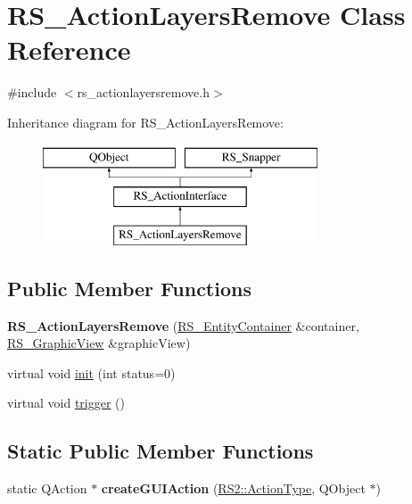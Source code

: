 \hypertarget{classRS__ActionLayersRemove}{\section{R\-S\-\_\-\-Action\-Layers\-Remove Class Reference}
\label{classRS__ActionLayersRemove}
}


{\ttfamily \#include $<$rs\-\_\-actionlayersremove.\-h$>$}

Inheritance diagram for R\-S\-\_\-\-Action\-Layers\-Remove\-:\begin{figure}[H]
\begin{center}
\leavevmode
\includegraphics[height=3.000000cm]{classRS__ActionLayersRemove}
\end{center}
\end{figure}
\subsection*{Public Member Functions}
\begin{DoxyCompactItemize}
\item 
\hypertarget{classRS__ActionLayersRemove_a7b2fbd6d0ccc23fa982b6b09833879ac}{{\bfseries R\-S\-\_\-\-Action\-Layers\-Remove} (\hyperlink{classRS__EntityContainer}{R\-S\-\_\-\-Entity\-Container} \&container, \hyperlink{classRS__GraphicView}{R\-S\-\_\-\-Graphic\-View} \&graphic\-View)}\label{classRS__ActionLayersRemove_a7b2fbd6d0ccc23fa982b6b09833879ac}

\item 
virtual void \hyperlink{classRS__ActionLayersRemove_ad5be6abe979d6e815d20e197c5f75f30}{init} (int status=0)
\item 
virtual void \hyperlink{classRS__ActionLayersRemove_a7ebb169708eac14122ecf2599d54175c}{trigger} ()
\end{DoxyCompactItemize}
\subsection*{Static Public Member Functions}
\begin{DoxyCompactItemize}
\item 
\hypertarget{classRS__ActionLayersRemove_a433d0275b8396a1830dd4606eeffe45b}{static Q\-Action $\ast$ {\bfseries create\-G\-U\-I\-Action} (\hyperlink{classRS2_afe3523e0bc41fd637b892321cfc4b9d7}{R\-S2\-::\-Action\-Type}, Q\-Object $\ast$)}\label{classRS__ActionLayersRemove_a433d0275b8396a1830dd4606eeffe45b}

\end{DoxyCompactItemize}
